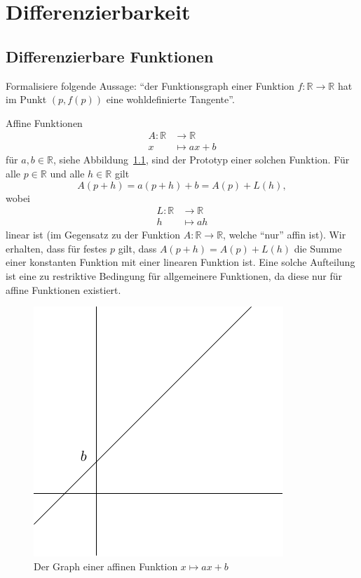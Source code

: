 \documentclass[../main.tex]{subfiles}
\begin{document}
\chapter{Differenzierbarkeit}
\section{Differenzierbare Funktionen}
\begin{goal}
  Formalisiere
  folgende Aussage:
  ``der Funktionsgraph einer Funktion
  $f \colon \mathbb{R} \to \mathbb{R}$
  hat im Punkt $(p, f(p))$ eine 
  wohldefinierte Tangente''.
\end{goal}

Affine Funktionen 
\begin{align*}
  A \colon \mathbb{R} & \to \mathbb{R} \\
  x & \mapsto ax + b
\end{align*}
für $a, b \in \mathbb{R}$,
siehe Abbildung~\ref{fig:affin},
sind der Prototyp
einer solchen Funktion.
Für alle $p \in \mathbb{R}$ und
alle $h \in \mathbb{R}$ gilt
\[
  A(p+h) = a(p+ h) + b = A(p) + L(h),
\]
wobei
\begin{align*}
  L \colon \mathbb{R} & \to \mathbb{R} \\
  h & \mapsto ah
\end{align*}
linear ist (im Gegensatz
zu der Funktion
$A \colon \mathbb{R} \to \mathbb{R}$,
welche ``nur'' affin ist).
Wir erhalten, dass für festes $p$ 
gilt, dass
  $A(p+h) = A(p) + L(h)$
die Summe einer konstanten
Funktion mit einer linearen Funktion ist.
Eine solche Aufteilung ist
eine zu restriktive Bedingung
für allgemeinere Funktionen,
da diese nur für affine Funktionen
existiert.


\begin{figure}[htb]
  \centering
  \includegraphics{images/affine}
  \caption{Der
  Graph einer affinen Funktion
$x \mapsto ax + b$}%
  \label{fig:affin}
\end{figure}
\end{document}
